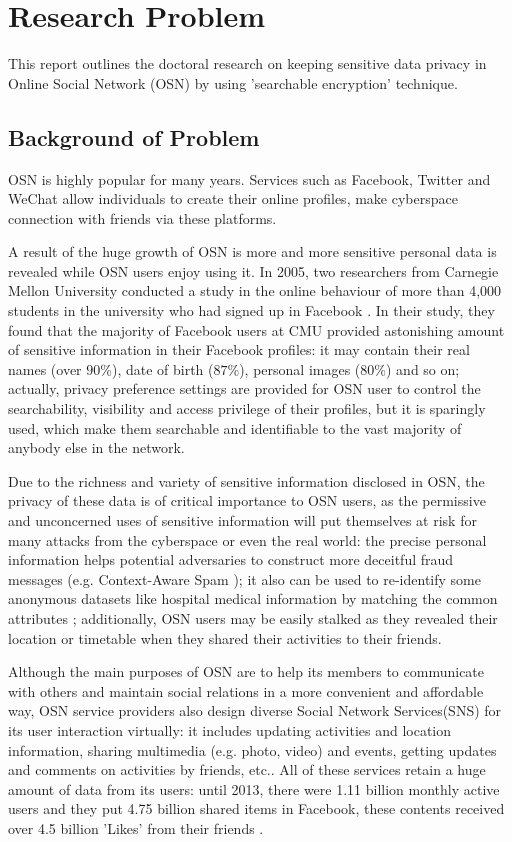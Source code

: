 \chapter{Research Problem}
This report outlines the doctoral research on keeping sensitive data privacy in Online Social Network (OSN) by using 'searchable encryption' technique. 
\section{Background of Problem}
OSN is highly popular for many years. Services such as Facebook, Twitter and WeChat allow individuals to create their online profiles, make cyberspace connection with friends via these platforms. 

A result of the huge growth of OSN is more and more sensitive personal data is revealed while OSN users enjoy using it. In 2005, two researchers from Carnegie Mellon University conducted a study in the online behaviour of more than 4,000 students in the university who had signed up in Facebook \cite{gross2005information}. In their study, they found that the majority of Facebook users at CMU provided astonishing amount of sensitive information in their Facebook profiles: it may contain their real names (over $90\%$), date of birth ($87\%$), personal images ($80\%$) and so on; actually, privacy preference settings are provided for OSN user to control the searchability, visibility and access privilege of their profiles, but it is sparingly used, which make them searchable and identifiable to the vast majority of anybody else in the network. 

Due to the richness and variety of sensitive information disclosed in OSN, the privacy of these data is of critical importance to OSN users, as the permissive and unconcerned uses of sensitive information will put themselves at risk for many attacks from the cyberspace or even the real world: the precise personal information helps potential adversaries to construct more deceitful fraud messages (e.g. Context-Aware Spam \cite{brown2008social}); it also can be used to re-identify some anonymous datasets like hospital medical information by matching the common attributes \cite{sweeney2002k}; additionally, OSN users may be easily stalked as they revealed their location or timetable when they shared their activities to their friends.

Although the main purposes of OSN are to help its members to communicate with others and maintain social relations in a more convenient and affordable way, OSN service providers also design diverse Social Network Services(SNS) for its user interaction virtually: it includes updating activities and location information, sharing multimedia (e.g. photo, video) and events, getting updates and comments on activities by friends, etc.. All of these services retain a huge amount of data from its users: until 2013, there were 1.11 billion monthly active users and they put 4.75 billion shared items in Facebook, these contents received over 4.5 billion 'Likes' from their friends \cite{facebook2013growth}. 

